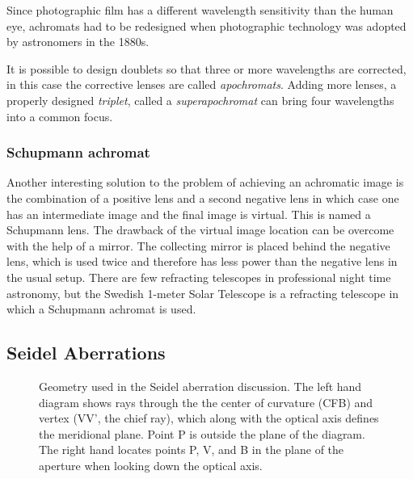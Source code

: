 \documentclass{article}
\begin{document}
Since photographic film has a different wavelength sensitivity than the
human eye, achromats had to be redesigned when photographic technology 
was adopted by astronomers in the 1880s. 

It is possible to design doublets so that three or more wavelengths are corrected, in this
case the corrective lenses are called {\it apochromats}. Adding more lenses, a properly 
designed {\it triplet}, called a {\it superapochromat} can bring four wavelengths into 
a common focus.

\subsubsection{Schupmann achromat}

Another interesting solution to the problem of achieving an achromatic image
is the combination of a positive lens and a second negative lens in which case
one has an intermediate image and the final image is virtual. This is named
a Schupmann lens. The drawback of the virtual image location can be overcome
with the help of a mirror. The collecting mirror is placed behind the negative
lens, which is used twice and therefore has less power than the negative lens
in the usual setup. There are few refracting telescopes in professional night 
time astronomy, but the Swedish 1-meter Solar Telescope is a refracting 
telescope in which a Schupmann achromat is used.

\subsection{Seidel Aberrations}

\begin{figure}[th!]
  \caption{Geometry used in the Seidel aberration discussion. The left hand
diagram shows rays through the the center of curvature (CFB) and vertex (VV', the chief ray), which
along with the optical axis defines the meridional plane. Point P is outside the plane of the diagram. 
The right hand locates points P, V, and B in the plane of the aperture when looking down the optical axis.}
  \label{fig:aberration-geometry}
\end{figure}
\end{document}
